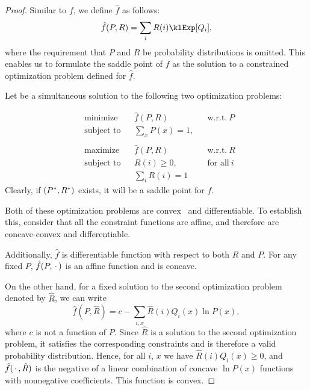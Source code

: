\begin{proof}
    Similar to $f$, we define $\hat{f}$ as follows:
    \begin{equation*}
        \hat{f}(P, R) = \fExp,
    \end{equation*}
    where the requirement that $P$ and $R$ be probability distributions is omitted.
    This enables us to formulate the saddle point of $f$ as the solution to a constrained optimization problem
    defined for $\hat{f}$.

    Let \saddle be a simultaneous solution to the following two optimization problems:

    \begin{equation}
        \begin{aligned}
            &\text{minimize} & &\hat{f}(P,R) & &\text{w.r.t.} \ P \\
            &\text{subject to} & &\sum_{x} P(x) = 1, \\
            \\
            &\text{maximize} & &\hat{f}(P,R) & &\text{w.r.t.} \ R \\
            &\text{subject to} & &R(i) \geq 0, & &\text{for all} \ i  \\
            & & &\sum_{i} R(i) = 1 &
        \end{aligned}\label{eq:twin_optimization}
    \end{equation}
    Clearly, if $(P^{*}, R^{*})$ exists, it will be a saddle point for $f$.

    Both of these optimization problems are convex~\cite{0521833787} and differentiable.
    To establish this, consider that all the constraint functions are affine, and therefore are concave-convex and
    differentiable.

    Additionally, $\hat{f}$ is differentiable function with respect to both $R$ and $P$.
    For any fixed $P$, $\hat{f}(P,\, \cdot \,)$ is an affine function and is concave.

    On the other hand, for a fixed solution to the second optimization problem denoted by $\hat{R}$, we can write
    \begin{equation}
        \label{eq:simplified_f}
        \hat{f}(P,\hat{R}) = c - \sum_{i,x} \hat{R}(i) Q_i(x) \ln P(x),
    \end{equation}
    where $c$ is not a function of $P$.
    Since $\hat{R}$ is a solution to the second optimization problem, it satisfies the corresponding constraints and
    is therefore a valid probability distribution.
    Hence, for all $i$, $x$ we have $\hat{R}(i)Q_i(x) \geq 0$, and $\hat{f}(\, \cdot \,, \hat{R})$  is
    the negative of a linear combination of concave $\ln P(x)$ functions with nonnegative coefficients.
    This function is convex.


\end{proof}
